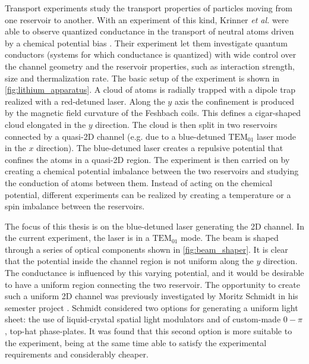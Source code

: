 Transport experiments study the transport properties of particles moving from one reservoir to another. With an experiment of this kind, Krinner \emph{et al.} were able to observe  quantized conductance in the transport of neutral atoms driven by a chemical potential bias \cite{krinner2015}. Their experiment let them investigate
quantum conductors (systems for which conductance is quantized) with wide control over the channel
geometry and the reservoir properties, such as interaction strength, size and thermalization rate. The basic setup of the experiment is shown in \cref{fig:lithium_apparatus}. A cloud of atoms is radially trapped with a dipole trap realized with a red-detuned laser. Along the $y$ axis the confinement is produced by the magnetic field curvature of the Feshbach coils. This defines a cigar-shaped cloud elongated in the $y$ direction. The cloud is then split in two reservoirs connected by a quasi-2D channel (e.g. due to a blue-detuned $\text{TEM}_{01}$ laser mode in the $x$ direction). The blue-detuned laser creates a repulsive potential that confines the atoms in a quasi-2D region. The experiment is then carried on by creating a chemical potential imbalance between the two reservoirs and studying the conduction of atoms between them. Instead of acting on the chemical potential, different experiments can be realized by creating a temperature or a spin imbalance between the reservoirs.

The focus of this thesis is on the blue-detuned laser generating the 2D channel. In the current experiment, the laser is in a $\text{TEM}_{01}$ mode. The beam is shaped through a series of optical components shown in \cref{fig:beam_shaper}. It is clear that the potential inside the channel region is not uniform along the $y$ direction. The conductance is influenced by this varying potential, and it would be desirable to have a uniform region connecting the two reservoir. The opportunity to create such a uniform 2D channel was previously investigated by Moritz Schmidt in his semester project \cite{schmidt2021}. Schmidt considered two options for generating a uniform light sheet: the use of liquid-crystal spatial light modulators and of custom-made $0-\pi$, top-hat phase-plates. It was found that this second option is more suitable to the experiment, being at the same time  able to satisfy the experimental requirements and considerably cheaper.

